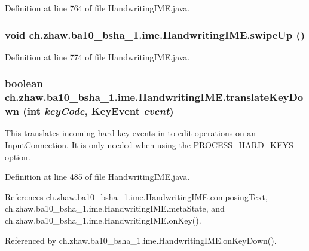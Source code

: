 Definition at line 764 of file HandwritingIME.java.\hypertarget{classch_1_1zhaw_1_1ba10__bsha__1_1_1ime_1_1HandwritingIME_a76b1e0dc03f0b6d2641cf60325dee604}{
\subsubsection[{swipeUp}]{\setlength{\rightskip}{0pt plus 5cm}void ch.zhaw.ba10\_\-bsha\_\-1.ime.HandwritingIME.swipeUp ()}}
\label{classch_1_1zhaw_1_1ba10__bsha__1_1_1ime_1_1HandwritingIME_a76b1e0dc03f0b6d2641cf60325dee604}


Definition at line 774 of file HandwritingIME.java.\hypertarget{classch_1_1zhaw_1_1ba10__bsha__1_1_1ime_1_1HandwritingIME_a25b3410857b8a7b81ad09b2a76ca352c}{
\subsubsection[{translateKeyDown}]{\setlength{\rightskip}{0pt plus 5cm}boolean ch.zhaw.ba10\_\-bsha\_\-1.ime.HandwritingIME.translateKeyDown (int {\em keyCode}, \/  KeyEvent {\em event})}}
\label{classch_1_1zhaw_1_1ba10__bsha__1_1_1ime_1_1HandwritingIME_a25b3410857b8a7b81ad09b2a76ca352c}
This translates incoming hard key events in to edit operations on an \hyperlink{}{InputConnection}. It is only needed when using the PROCESS\_\-HARD\_\-KEYS option. 

Definition at line 485 of file HandwritingIME.java.

References ch.zhaw.ba10\_\-bsha\_\-1.ime.HandwritingIME.composingText, ch.zhaw.ba10\_\-bsha\_\-1.ime.HandwritingIME.metaState, and ch.zhaw.ba10\_\-bsha\_\-1.ime.HandwritingIME.onKey().

Referenced by ch.zhaw.ba10\_\-bsha\_\-1.ime.HandwritingIME.onKeyDown().

